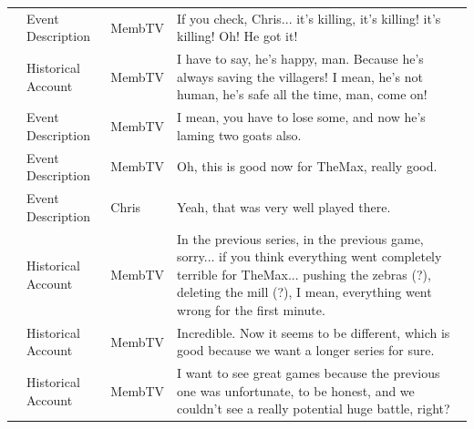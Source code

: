 {\begin{longtable}{@{}>{\theAppRow}r|L{2.3cm}L{1.0cm}U{11.55cm}@{}}
    & Event Description     & MembTV       & If you check, Chris... it's killing, it's killing!  it's killing! Oh! He got it!                                                                                                                                                                                 \\
    & Historical Account    & MembTV       & I have to say, he's happy, man. Because he's always saving the villagers! I mean, he's not human, he's safe all the time, man, come on!                                                                                                                          \\
    & Event Description     & MembTV       & I mean, you have to lose some, and now he's laming two goats also.                                                                                                                                                                                               \\
    & Event Description     & MembTV       & Oh, this is good now for TheMax, really good.                                                                                                                                                                                                                    \\
    & Event Description     & Chris        & Yeah, that was very well played there.                                                                                                                                                                                                                           \\
    & Historical Account    & MembTV       & In the previous series, in the previous game, sorry... if you think everything went completely terrible for TheMax... pushing the zebras (?), deleting the mill (?), I mean, everything went wrong for the first minute.                                         \\
    & Historical Account    & MembTV       & Incredible. Now it seems to be different, which is good because we want a longer series for sure.                                                                                                                                                                \\
    & Historical Account    & MembTV       & I want to see great games because the previous one was unfortunate, to be honest, and we couldn't see a really potential huge battle, right?                                                                                                                     \\

\end{longtable}}
